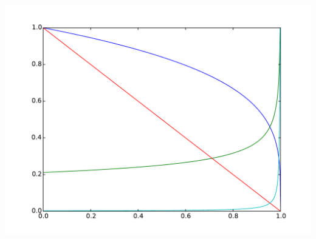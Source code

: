 \documentclass[11pt]{article}
\begin{document}
\includegraphics[width=.9\linewidth]{cooling-shell.pdf}
\end{document}
